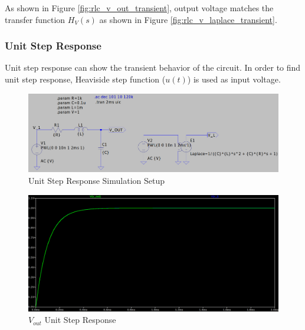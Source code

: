 As shown in Figure \ref{fig:rlc_v_out_transient}, output voltage matches the transfer function $H_{V}(s)$ as shown in Figure \ref{fig:rlc_v_laplace_transient}.

\newpage
\thispagestyle{plain}

\subsubsection{Unit Step Response}
Unit step response can show the transient behavior of the circuit. In order to find unit step response, Heaviside step function ($u(t)$) is used as input voltage.

\begin{figure}[h]
    \centering
    \includegraphics[width=1\textwidth, height=0.4\textheight]{assets/rlc-unit-step-sim.png}
    \caption{Unit Step Response Simulation Setup}
    \label{fig:unit_step_response}
\end{figure}

\newpage
\thispagestyle{plain}

\begin{figure}[h]
    \centering
    \includegraphics[width=1\textwidth]{assets/rlc-unit-step-sim-v-out.png}
    \caption{$V_{out}$ Unit Step Response}
    \label{fig:rlc_v_out_unit_step_response}
\end{figure}

